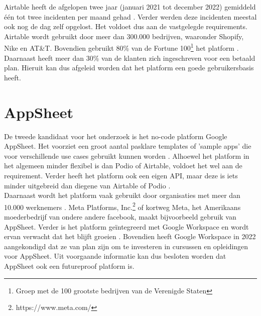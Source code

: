 Airtable heeft de afgelopen twee jaar (januari 2021 tot december 2022) gemiddeld één tot twee incidenten per maand gehad \autocite{AirtableStatus}. Verder werden deze incidenten meestal ook nog de dag zelf opgelost. Het voldoet dus aan de vastgelegde requirements. \\

Airtable wordt gebruikt door meer dan 300.000 bedrijven, waaronder Shopify, Nike en AT\&T. Bovendien gebruikt 80\% van de Fortune 100\footnote{Groep met de 100 grootste bedrijven van de Verenigde Staten} het platform \autocite{Prokopets2022}. Daarnaast heeft meer dan 30\% van de klanten zich ingeschreven voor een betaald plan. Hieruit kan dus afgeleid worden dat het platform een goede gebruikersbasis heeft. \\


\section{AppSheet}

De tweede kandidaat voor het onderzoek is het no-code platform Google AppSheet. Het voorziet een groot aantal pasklare templates of 'sample apps' die voor verschillende use cases gebruikt kunnen worden \autocite{AppSheetTemplates}. Alhoewel het platform in het algemeen minder flexibel is dan Podio of Airtable, voldoet het wel aan de requirement. Verder heeft het platform ook een eigen API, maar deze is iets minder uitgebreid dan diegene van Airtable of Podio \autocite{AppSheetAPI}. \\

Daarnaast wordt het platform vaak gebruikt door organisaties met meer dan 10.000 werknemers \autocite{Enlyft}. Meta Platforms, Inc.\footnote{https://www.meta.com/} of kortweg Meta, het Amerikaans moederbedrijf van ondere andere facebook, maakt bijvoorbeeld gebruik van AppSheet. Verder is het platform geïntegreerd met Google Workspace en wordt ervan verwacht dat het blijft groeien \autocite{Anand2022}. Bovendien heeft Google Workspace in 2022 aangekondigd dat ze van plan zijn om te investeren in cursussen en opleidingen voor AppSheet. Uit voorgaande informatie kan dus besloten worden dat AppSheet ook een futureproof platform is. \\ 

